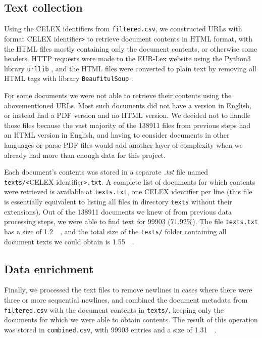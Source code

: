 \documentclass[sigconf, authorversion]{acmart}
\begin{document}
\subsection{Text collection}

Using the CELEX identifiers from \texttt{filtered.csv}, we constructed URLs with format CELEX identifier\texttt{>} to retrieve document contents in HTML format, with the HTML files mostly containing only the document contents, or otherwise some headers. HTTP requests were made to the EUR-Lex website using the Python3 library \texttt{urllib} \cite{urllib}, and the HTML files were converted to plain text by removing all HTML tags with library \texttt{BeaufitulSoup} \cite{beautifulsoup}.

For some documents we were not able to retrieve their contents using the abovementioned URLs. Most such documents did not have a version in English, or instead had a PDF version and no  HTML version. We decided not to handle those files because the vast majority of the \SI{138911}{} files from previous steps had an HTML version in English, and having to consider documents in other languages or parse PDF files would add another layer of complexity when we already had more than enough data for this project.

Each document's contents was stored in a separate \textit{.txt} file named \texttt{texts/<}CELEX identifier\texttt{>.txt}. A complete list of documents for which contents were retrieved is available at \texttt{texts.txt}, one CELEX identifier per line (this file is essentially equivalent to listing all files in directory \texttt{texts} without their extensions). Out of the \SI{138911}{} documents we knew of from previous data processing steps, we were able to find text for \SI{99903}{} ($71.92\%$). The file \texttt{texts.txt} has a size of \SI{1.2}{\mega\byte}, and the total size of the \texttt{texts/} folder containing all document texts we could obtain is \SI{1.55}{\giga\byte}.

\subsection{Data enrichment}

Finally, we processed the text files to remove newlines in cases where there were three or more sequential newlines, and combined the document metadata from \texttt{filtered.csv} with the document contents in \texttt{texts/}, keeping only the documents for which we were able to obtain contents. The result of this operation was stored in \texttt{combined.csv}, with \SI{99903}{} entries and a size of \SI{1.31}{\giga\byte}.
\end{document}
